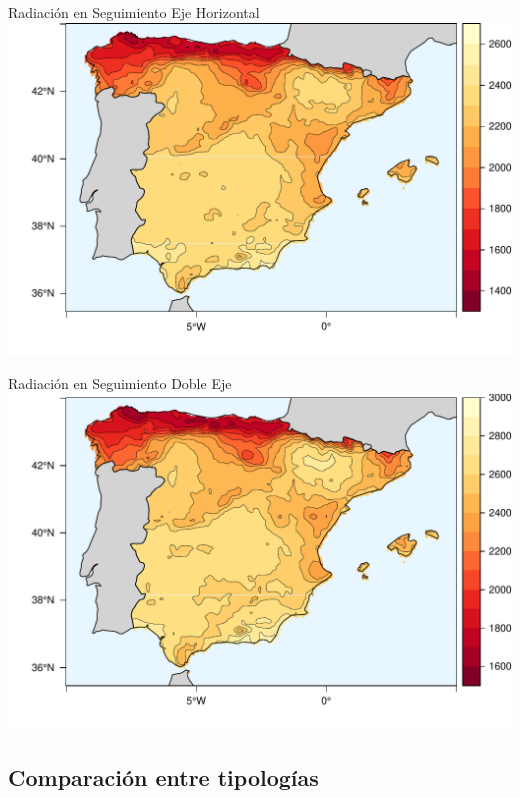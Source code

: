 \documentclass[xcolor={usenames,svgnames,dvipsnames}]{beamer}
\begin{document}
\begin{frame}[label=sec-4-0-2]{Radiación en Seguimiento Eje Horizontal}
\includegraphics[width=.9\linewidth]{../figs/HorizKrig.pdf}
\end{frame}



\begin{frame}[label=sec-4-0-3]{Radiación en Seguimiento Doble Eje}
\includegraphics[width=.9\linewidth]{../figs/TwoKrig.pdf}
\end{frame}

\subsection{Comparación entre tipologías}
\label{sec-4-1}
\end{document}

